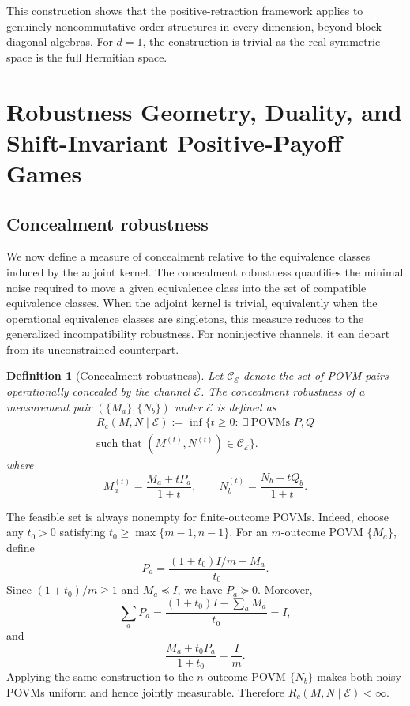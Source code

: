 \documentclass[
aps,pra,twocolumn,10pt,
superscriptaddress,longbibliography,floatfix
]{revtex4-2}
\newtheorem{definition}[theorem]{Definition}
\begin{document}
This construction shows that the positive-retraction framework applies to genuinely noncommutative order structures in every dimension, beyond block-diagonal algebras. For $d=1$, the construction is trivial as the real-symmetric space is the full Hermitian space.

\section{Robustness Geometry, Duality, and Shift-Invariant Positive-Payoff Games}
\label{sec:quantitative}

\subsection{Concealment robustness}

We now define a measure of concealment relative to the equivalence classes induced by the adjoint kernel. The concealment robustness quantifies the minimal noise required to move a given equivalence class into the set of compatible equivalence classes. When the adjoint kernel is trivial, equivalently when the operational equivalence classes are singletons, this measure reduces to the generalized incompatibility robustness. For noninjective channels, it can depart from its unconstrained counterpart.

\begin{definition}[Concealment robustness]
\label{def:robustness}
Let $\mathcal C_{\mathcal E}$ denote the set of POVM pairs operationally concealed by the channel $\mathcal E$. The concealment robustness of a measurement pair $(\{M_a\},\{N_b\})$ under $\mathcal E$ is defined as
\begin{multline}
R_c(M,N\mid\mathcal E)
:=\inf\bigl\{t\ge0:\ \exists\ \text{POVMs }P,Q\\
\text{such that }(M^{(t)},N^{(t)})\in\mathcal C_{\mathcal E}\bigr\}.
\end{multline}
where
\[
M_a^{(t)}=\frac{M_a+tP_a}{1+t},
\qquad
N_b^{(t)}=\frac{N_b+tQ_b}{1+t}.
\]
\end{definition}

The feasible set is always nonempty for finite-outcome POVMs. Indeed, choose any $t_0>0$ satisfying $t_0\ge\max\{m-1,n-1\}$. For an $m$-outcome POVM $\{M_a\}$, define
\[
P_a=\frac{(1+t_0)I/m-M_a}{t_0}.
\]
Since $(1+t_0)/m\ge1$ and $M_a\preceq I$, we have $P_a\succeq0$. Moreover,
\[
\sum_aP_a
=
\frac{(1+t_0)I-\sum_aM_a}{t_0}
=
I,
\]
and
\[
\frac{M_a+t_0P_a}{1+t_0}=\frac{I}{m}.
\]
Applying the same construction to the $n$-outcome POVM $\{N_b\}$ makes both noisy POVMs uniform and hence jointly measurable. Therefore $R_c(M,N\mid\mathcal E)<\infty$.
\end{document}
